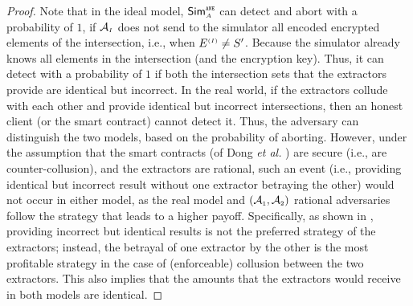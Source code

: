 \begin{proof}
Note that in the ideal model, $\mathsf{Sim}^{\scriptscriptstyle \mathtt{ANE}}_{\scriptscriptstyle A}$ can detect and abort with a probability of $1$, if $\mathcal{A}_{\scriptscriptstyle I}$ does not send to the simulator all encoded encrypted elements of the intersection,  i.e., when $E^{\scriptscriptstyle (I)}\neq S'$. Because the simulator already knows all elements in the intersection (and the encryption key). Thus, it can detect with a probability of $1$ if both the intersection sets that the extractors provide are identical but incorrect.   
%
 In the real world, if the extractors collude with each other and provide identical but incorrect intersections,   then an honest client (or the smart contract) cannot detect it. Thus, the adversary can distinguish the two models, based on the probability of aborting.  However, under the assumption that the smart contracts (of Dong \textit{et al.} \cite{dong2017betrayal}) are secure (i.e., are counter-collusion), and the extractors are rational, such an event (i.e., providing identical but incorrect result without one extractor betraying the other) would not occur in either model, as the real model and $(\mathcal{A}_{\scriptscriptstyle 1}, \mathcal{A}_{\scriptscriptstyle 2})$ rational adversaries follow the strategy that leads to a higher payoff. Specifically, as shown in \cite{dong2017betrayal}, providing incorrect but identical results is not the preferred strategy of the extractors; instead, the betrayal of one extractor by the other is the most profitable strategy in the case of (enforceable) collusion between the two extractors. This also implies that the amounts that the extractors would receive in both models are identical. 




\end{proof}
